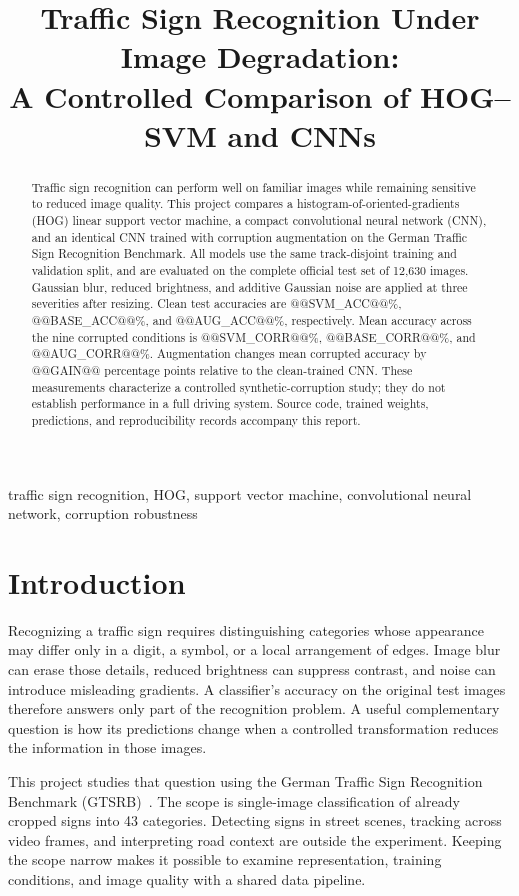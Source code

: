 \documentclass[conference]{IEEEtran}
\begin{document}
\title{Traffic Sign Recognition Under Image Degradation:\\A Controlled Comparison of HOG--SVM and CNNs}
\author{}
\maketitle
\begin{abstract}
Traffic sign recognition can perform well on familiar images while remaining sensitive to reduced image quality. This project compares a histogram-of-oriented-gradients (HOG) linear support vector machine, a compact convolutional neural network (CNN), and an identical CNN trained with corruption augmentation on the German Traffic Sign Recognition Benchmark. All models use the same track-disjoint training and validation split, and are evaluated on the complete official test set of 12,630 images. Gaussian blur, reduced brightness, and additive Gaussian noise are applied at three severities after resizing. Clean test accuracies are @@SVM_ACC@@\%, @@BASE_ACC@@\%, and @@AUG_ACC@@\%, respectively. Mean accuracy across the nine corrupted conditions is @@SVM_CORR@@\%, @@BASE_CORR@@\%, and @@AUG_CORR@@\%. Augmentation changes mean corrupted accuracy by @@GAIN@@ percentage points relative to the clean-trained CNN. These measurements characterize a controlled synthetic-corruption study; they do not establish performance in a full driving system. Source code, trained weights, predictions, and reproducibility records accompany this report.
\end{abstract}
\begin{IEEEkeywords}
traffic sign recognition, HOG, support vector machine, convolutional neural network, corruption robustness
\end{IEEEkeywords}

\section{Introduction}
Recognizing a traffic sign requires distinguishing categories whose appearance may differ only in a digit, a symbol, or a local arrangement of edges. Image blur can erase those details, reduced brightness can suppress contrast, and noise can introduce misleading gradients. A classifier's accuracy on the original test images therefore answers only part of the recognition problem. A useful complementary question is how its predictions change when a controlled transformation reduces the information in those images.

This project studies that question using the German Traffic Sign Recognition Benchmark (GTSRB)~\cite{gtsrb}. The scope is single-image classification of already cropped signs into 43 categories. Detecting signs in street scenes, tracking across video frames, and interpreting road context are outside the experiment. Keeping the scope narrow makes it possible to examine representation, training conditions, and image quality with a shared data pipeline.
\end{document}
